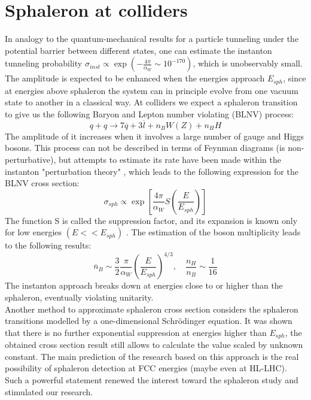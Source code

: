 \documentclass[a4paper,12pt]{article}         %
\begin{document}
\section{Sphaleron at colliders}
In analogy to the quantum-mechanical results for a particle tunneling under the potential barrier between different states, one can estimate the instanton tunneling probability $\sigma_{inst}\propto\exp\left( -\frac{4\pi}{\alpha_W}\sim 10^{-170} \right)$, which is unobservably small. The amplitude is expected to be enhanced when the energies approach $E_{sph}$, since at energies above sphaleron the system can in principle evolve from one vacuum state to another in a classical way. At colliders we expect a sphaleron transition to give us the following Baryon and Lepton number violating (BLNV) process:
\begin{equation}\label{sphaleron_reaction}
q + q \rightarrow 7 \overline{q} + 3 \overline{l} + n_B W(Z) + n_H H
\end{equation}
The amplitude of it increases when it involves a large number of gauge and Higgs bosons. This process can not be described in terms of Feynman diagrams (is non-perturbative), but attempts to estimate its rate have been made within the instanton "perturbation theory" \cite{hooft}, which leads to the following expression for the BLNV cross section:
\begin{equation}\label{sph_cross_section}
\sigma_{sph}\propto \exp \left[ \frac{4\pi}{\alpha_W} S\left( \frac{E}{E_{sph}}\right)\right]
\end{equation}
The function S is called the suppression factor, and its expansion is known only for low energies $(E<<E_{sph})$ \cite{khlebnikov}. The estimation of the boson multiplicity leads to the following results:
\begin{equation} \label{boson_mult}
\overline{n}_B \sim \frac{3}{2} \frac{\pi}{\alpha_W} \left( \frac{E}{E_{sph}} \right)^{4/3}, \quad \frac{n_H}{n_B} \sim \frac{1}{16}
\end{equation}
The instanton approach breaks down at energies close to or higher than the sphaleron, eventually violating unitarity. \\
Another method to approximate sphaleron cross section \cite{tye_wong} considers the sphaleron transitions modelled by a one-dimensional Schr\"{o}dinger equation. It was shown that there is no further exponential suppression at energies higher than $E_{sph}$, the obtained cross section result still allows to calculate the value scaled by unknown constant. The main prediction of the research based on this approach \cite{ellis} is the real possibility of sphaleron detection at FCC energies (maybe even at HL-LHC). Such a powerful statement renewed the interest toward the sphaleron study and stimulated our research.
\end{document}
